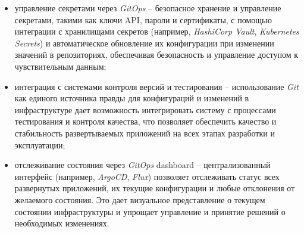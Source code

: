\begin{itemize}
    \item управление секретами через \textit{GitOps} -- безопасное хранение и управление секретами, такими как ключи API, пароли и сертификаты, с помощью интеграции с хранилищами секретов (например, \textit{HashiCorp Vault}, \textit{Kubernetes Secrets}) и автоматическое обновление их конфигурации при изменении значений в репозиториях, обеспечивая безопасность и управление доступом к чувствительным данным;
    \item интеграция с системами контроля версий и тестирования -- использование \textit{Git} как единого источника правды для конфигураций и изменений в инфраструктуре дает возможность интегрировать систему с процессами тестирования и контроля качества, что позволяет обеспечить качество и стабильность развертываемых приложений на всех этапах разработки и эксплуатации;
    \item отслеживание состояния через \textit{GitOps} dashboard -- централизованный интерфейс (например, \textit{ArgoCD}, \textit{Flux}) позволяет отслеживать статус всех развернутых приложений, их текущие конфигурации и любые отклонения от желаемого состояния. Это дает визуальное представление о текущем состоянии инфраструктуры и упрощает управление и принятие решений о необходимых изменениях.
\end{itemize}
